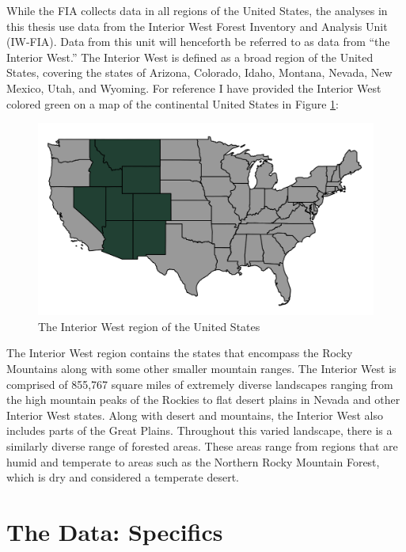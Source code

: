 \documentclass[12pt,twoside]{reedthesis}
\begin{document}
While the FIA collects data in all regions of the United States, the analyses in this thesis use data from the Interior West Forest Inventory and Analysis Unit (IW-FIA). Data from this unit will henceforth be referred to as data from ``the Interior West.'' The Interior West is defined as a broad region of the United States, covering the states of Arizona, Colorado, Idaho, Montana, Nevada, New Mexico, Utah, and Wyoming. For reference I have provided the Interior West colored green on a map of the continental United States in Figure \ref{fig:usa-map}:
\begin{figure}

{\centering \includegraphics[width=1\linewidth]{figure/interior-west-on-usa} 

}

\caption{The Interior West region of the United States}\label{fig:usa-map}
\end{figure}
The Interior West region contains the states that encompass the Rocky Mountains along with some other smaller mountain ranges. The Interior West is comprised of 855,767 square miles of extremely diverse landscapes ranging from the high mountain peaks of the Rockies to flat desert plains in Nevada and other Interior West states. Along with desert and mountains, the Interior West also includes parts of the Great Plains. Throughout this varied landscape, there is a similarly diverse range of forested areas. These areas range from regions that are humid and temperate to areas such as the Northern Rocky Mountain Forest, which is dry and considered a temperate desert.
\clearpage

\hypertarget{the-data-specifics}{%
\section{The Data: Specifics}\label{the-data-specifics}}
\end{document}
